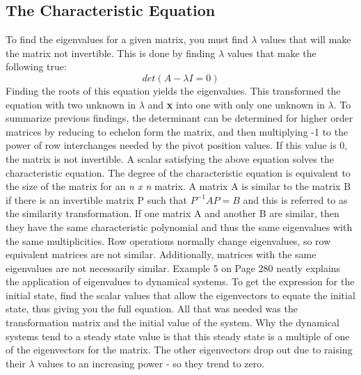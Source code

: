 \documentclass[12pt]{article}
\begin{document}
\subsection{The Characteristic Equation}
To find the eigenvalues for a given matrix, you must find $\lambda$ values that will make the matrix not invertible. This is done by finding $\lambda$ values that make the following true:
\newline
$$
det(A-\lambda I=0)
$$
\newline
Finding the roots of this equation yields the eigenvalues. This transformed the equation with two unknown in $\lambda$ and \textbf{x} into one with only one unknown in $\lambda$. To 
summarize previous findings, the determinant can be determined for higher order matrices by reducing to echelon form the matrix, and then multiplying -1 to the power of row interchanges 
needed by the pivot position values. If this value is 0, the matrix is not invertible. A scalar satisfying the above equation solves the characteristic equation. The degree of the 
characteristic equation is equivalent to the size of the matrix for an \textit{n x n} matrix. 
\newline
\newline
A matrix A is similar to the matrix B if there is an invertible matrix P such that $P^{-1}AP=B$ and this is referred to as the similarity transformation. If one matrix A and another B are 
similar, then they have the same characteristic polynomial and thus the same eigenvalues with the same multiplicities. Row operations normally change eigenvalues, so row equivalent 
matrices are not similar. Additionally, matrices with the same eigenvalues are not necessarily similar. Example 5 on Page 280 neatly explains the application of eigenvalues to 
dynamical systems. To get the expression for the initial state, find the scalar values that allow the eigenvectors to equate the initial state, thus giving you the full equation. 
All that was needed was the transformation matrix and the initial value of the system. Why the dynamical systems tend to a steady state value is that this steady state is a multiple 
of one of the eigenvectors for the matrix. The other eigenvectors drop out due to raising their $\lambda$ values to an increasing power - so they trend to zero. 
\end{document}
